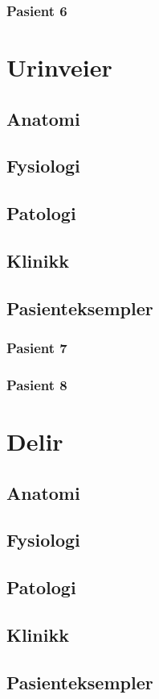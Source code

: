 \documentclass[a4paper,12pt,twoside]{memoir}
\begin{document}
			\subsection{Pasient 6}
	\chapter{Urinveier}
		\section{Anatomi}
		\section{Fysiologi}
		\section{Patologi}
		\section{Klinikk}
		\section{Pasienteksempler}
			\subsection{Pasient 7}
			\subsection{Pasient 8}
	\chapter{Delir}
		\section{Anatomi}
		\section{Fysiologi}
		\section{Patologi}
		\section{Klinikk}
		\section{Pasienteksempler}
\end{document}
